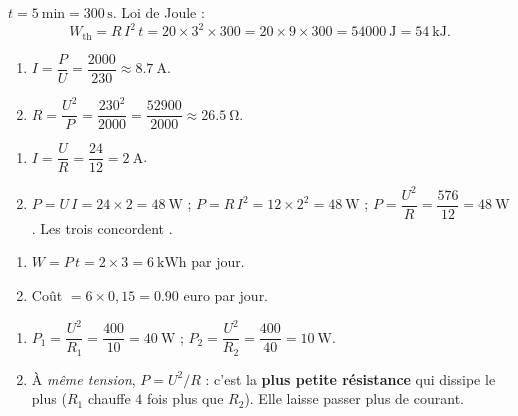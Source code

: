 \documentclass[11pt,a4paper]{article}
\begin{document}
\usetikzlibrary{babel}
\begin{corrige}
$t=\qty{5}{\minute}=300\,\si{\second}$. Loi de Joule :
\[ W_{\text{th}}=R\,I^{2}\,t=20\times3^{2}\times300=20\times9\times300=\qty{54000}{\joule}=\qty{54}{\kilo\joule}. \]
\end{corrige}

\begin{corrige}
\begin{enumerate}[label=\alph*)]
  \item $I=\dfrac{P}{U}=\dfrac{2000}{230}\approx\qty{8.7}{\ampere}$.
  \item $R=\dfrac{U^{2}}{P}=\dfrac{230^{2}}{2000}=\dfrac{52900}{2000}\approx\qty{26.5}{\ohm}$.
\end{enumerate}
\end{corrige}

\begin{corrige}
\begin{enumerate}[label=\alph*)]
  \item $I=\dfrac{U}{R}=\dfrac{24}{12}=\qty{2}{\ampere}$.
  \item $P=U\,I=24\times2=\qty{48}{\watt}$ ; \; $P=R\,I^{2}=12\times2^{2}=\qty{48}{\watt}$ ; \;
        $P=\dfrac{U^{2}}{R}=\dfrac{576}{12}=\qty{48}{\watt}$. Les trois concordent \checkmark.
\end{enumerate}
\end{corrige}

\begin{corrige}
\begin{enumerate}[label=\alph*)]
  \item $W=P\,t=2\times3=\qty{6}{\kilo\watt\hour}$ par jour.
  \item Coût $=6\times0{,}15=\num{0.90}$ euro par jour.
\end{enumerate}
\end{corrige}

\begin{corrige}
\begin{enumerate}[label=\alph*)]
  \item $P_1=\dfrac{U^{2}}{R_1}=\dfrac{400}{10}=\qty{40}{\watt}$ ; \;
        $P_2=\dfrac{U^{2}}{R_2}=\dfrac{400}{40}=\qty{10}{\watt}$.
  \item À \emph{même tension}, $P=U^2/R$ : c'est la \textbf{plus petite résistance} qui dissipe le plus
        ($R_1$ chauffe $4$ fois plus que $R_2$). Elle laisse passer plus de courant.
\end{enumerate}
\end{corrige}
\end{document}

